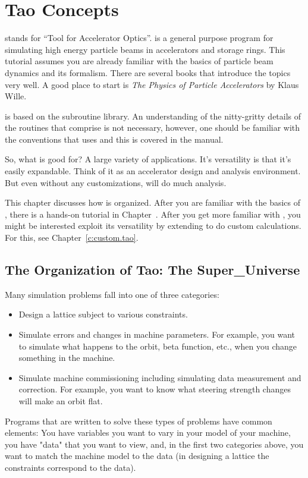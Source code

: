 \chapter{Tao Concepts}
\label{c:concepts}

\tao stands for ``Tool for Accelerator Optics''. \tao is a general
purpose program for simulating high energy particle beams in
accelerators and storage rings. This tutorial assumes you are already
familiar with the basics of particle beam dynamics and its
formalism. There are several books that introduce the topics very
well. A good place to start is \textit{The Physics of Particle
Accelerators} by Klaus Wille.

\tao is based on the \bmad\cite{b:bmad} subroutine library. An
understanding of the nitty-gritty details of the routines that
comprise \bmad is not necessary, however, one should be familiar with
the conventions that \bmad uses and this is covered in the \bmad
manual.

So, what is \tao good for? A large variety of applications. It's
versatility is that it's easily expandable. Think of it as an
accelerator design and analysis environment. But even without any
customizations, \tao will do much analysis. 

This chapter discusses how \tao is organized. After you are familiar
with the basics of \tao, there is a hands-on tutorial in
Chapter~. After you get more familiar with \tao, you
might be interested exploit its versatility by extending \tao to do
custom calculations. For this, see Chapter~\ref{c:custom.tao}.

\section{The Organization of Tao: The Super\_Universe}
\label{s:organization}

Many simulation problems fall into one of three categories: 
\begin{itemize}
\item 
Design a lattice subject to various constraints.
\item
Simulate errors and changes in machine parameters. For example, you want to
simulate what happens to the orbit, beta function, etc., when you change
something in the machine. 
\item 
Simulate machine commissioning including simulating data measurement and
correction. For example, you want to know what steering strength changes will
make an orbit flat.
\end{itemize}
Programs that are written to solve these types of problems have common
elements: You have variables you want to vary in your model of your
machine, you have "data" that you want to view, and, in the first two
categories above, you want to match the machine model to the data (in
designing a lattice the constraints correspond to the data).

